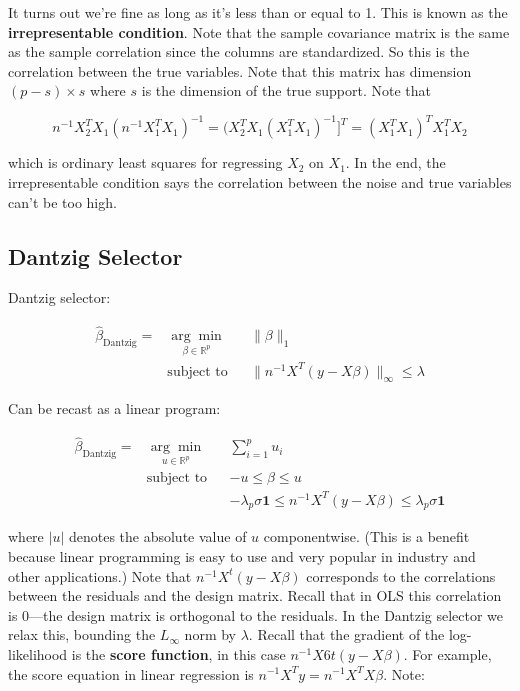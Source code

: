 It turns out we're fine as long as it's less than or equal to 1. This is known as the \textbf{irrepresentable condition}. Note that the sample covariance matrix is the same as the sample correlation since the columns are standardized. So this is the correlation between the true variables. Note that this matrix has dimension \((p-s) \times s\) where \(s\) is the dimension of the true support. Note that

\[
n^{-1} X_2^T X_1( n^{-1}X_1^T X_1)^{-1} = (X_2^T X_1 (X_1^T X_1)^{-1}]^T =(X_1^T X_1)^T X_1^T X_2
 \]
 
which is ordinary least squares for regressing \(X_2\) on \(X_1\). In the end, the irrepresentable condition says the correlation between the noise and true variables can't be too high.

\subsection{Dantzig Selector}

Dantzig selector:


\[
\begin{aligned}
\hat{\beta}_{\text{Dantzig}}  =  & {\underset {\beta \in \mathbb{R}^p}{\arg \min}}
& &  \lVert \beta \rVert_1 \\
& \text{subject to}
& &  \lVert n^{-1} X^T(y - X \beta) \rVert_\infty \leq \lambda
\end{aligned}
\]

Can be recast as a linear program:

\begin{equation}\label{linreg.dantzig.lp}
\begin{aligned}
\hat{\beta}_{\text{Dantzig}} =  & {\underset {u \in \mathbb{R}^p}{\arg \min}}
& & \sum_{i=1}^p u_i  \\
& \text{subject to}
& & -u \leq \beta \leq u \\
& & & -\lambda_p \sigma \boldsymbol{1} \leq n^{-1} X^T(y - X \beta) \leq \lambda_p \sigma \boldsymbol{1}
\end{aligned}
\end{equation}

where \(|u|\) denotes the absolute value of \(u\) componentwise. (This is a benefit because linear programming is easy to use and very popular in industry and other applications.) Note that \( n^{-1} X^t(y - X \beta) \) corresponds to the correlations between the residuals and the design matrix. Recall that in OLS this correlation is 0---the design matrix is orthogonal to the residuals. In the Dantzig selector we relax this, bounding the \(L_\infty\) norm by \(\lambda\). Recall that the gradient of the log-likelihood is the \textbf{score function}, in this case \(n^{-1} X6t(y - X \beta)\). For example, the score equation in linear regression is \(n^{-1} X^Ty = n^{-1} X^T X \beta\). Note:

